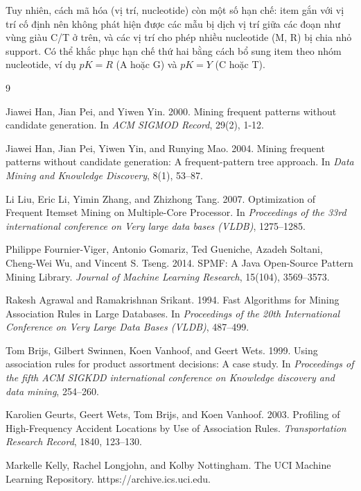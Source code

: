 \documentclass[conference]{IEEEtran}
\begin{document}
Tuy nhiên, cách mã hóa (vị trí, nucleotide) còn một số hạn chế: item gắn với vị trí cố định nên không phát hiện được các mẫu bị dịch vị trí giữa các đoạn như vùng giàu C/T ở trên, và các vị trí cho phép nhiều nucleotide (M, R) bị chia nhỏ support. Có thể khắc phục hạn chế thứ hai bằng cách bổ sung item theo nhóm nucleotide, ví dụ $pK{=}R$ (A hoặc G) và $pK{=}Y$ (C hoặc T).

\begin{thebibliography}{9}

Jiawei Han, Jian Pei, and Yiwen Yin. 2000. Mining frequent patterns without candidate generation. In \textit{ACM SIGMOD Record}, 29(2), 1-12.

Jiawei Han, Jian Pei, Yiwen Yin, and Runying Mao. 2004. Mining frequent patterns without candidate generation: A frequent-pattern tree approach. In \textit{Data Mining and Knowledge Discovery}, 8(1), 53--87.

Li Liu, Eric Li, Yimin Zhang, and Zhizhong Tang. 2007. Optimization of Frequent Itemset Mining on Multiple-Core Processor. In \textit{Proceedings of the 33rd international conference on Very large data bases (VLDB)}, 1275--1285.

Philippe Fournier-Viger, Antonio Gomariz, Ted Gueniche, Azadeh Soltani, Cheng-Wei Wu, and Vincent S. Tseng. 2014. SPMF: A Java Open-Source Pattern Mining Library. \textit{Journal of Machine Learning Research}, 15(104), 3569--3573.

Rakesh Agrawal and Ramakrishnan Srikant. 1994. Fast Algorithms for Mining Association Rules in Large Databases. In \textit{Proceedings of the 20th International Conference on Very Large Data Bases (VLDB)}, 487--499.

Tom Brijs, Gilbert Swinnen, Koen Vanhoof, and Geert Wets. 1999. Using association rules for product assortment decisions: A case study. In \textit{Proceedings of the fifth ACM SIGKDD international conference on Knowledge discovery and data mining}, 254--260.

Karolien Geurts, Geert Wets, Tom Brijs, and Koen Vanhoof. 2003. Profiling of High-Frequency Accident Locations by Use of Association Rules. \textit{Transportation Research Record}, 1840, 123--130.

Markelle Kelly, Rachel Longjohn, and Kolby Nottingham. The UCI Machine Learning Repository. https://archive.ics.uci.edu.


\end{thebibliography}
\end{document}

